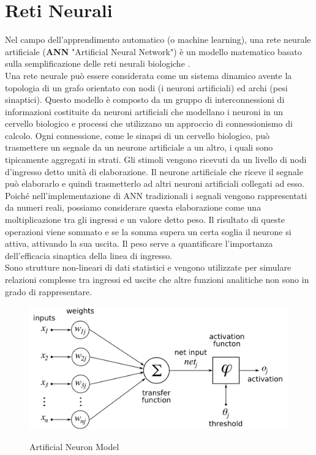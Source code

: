 \chapter{Reti Neurali}
\label{chap:RetiNeurali}

Nel campo dell'apprendimento automatico (o machine learning), una rete neurale artificiale (\textbf{ANN} "Artificial Neural Network") è un modello matematico basato sulla semplificazione delle reti neurali biologiche \cite{samuel1959some}. \\
Una rete neurale può essere considerata come un sistema dinamico avente la topologia di un grafo orientato con nodi (i neuroni artificiali) ed archi (pesi sinaptici).
Questo modello è composto da un gruppo di interconnessioni di informazioni costituite da neuroni artificiali che modellano i neuroni in un cervello biologico e processi che utilizzano un approccio di connessionismo di calcolo.
Ogni connessione, come le sinapsi di un cervello biologico, può trasmettere un segnale da un neurone artificiale a un altro, i quali sono tipicamente aggregati in strati. 
Gli stimoli vengono ricevuti da un livello di nodi d'ingresso detto unità di elaborazione. Il neurone artificiale che riceve il segnale può elaborarlo e quindi trasmetterlo ad altri neuroni artificiali collegati ad esso.\\
Poiché nell'implementazione di ANN tradizionali i segnali vengono rappresentati da numeri reali, possiamo considerare questa elaborazione come una moltiplicazione tra gli ingressi e un valore detto peso. Il risultato di queste operazioni viene sommato e se la somma supera un certa soglia il neurone si attiva, attivando la sua uscita.
Il peso serve a quantificare l'importanza dell'efficacia sinaptica della linea di ingresso.		\\
Sono strutture non-lineari di dati statistici e vengono utilizzate per simulare relazioni complesse tra ingressi ed uscite che altre funzioni analitiche non sono in grado di rappresentare.\\

\begin{figure}
	\centering
	{\includegraphics[width=.65\textwidth]{images/ArtificialNeuronModel}} \quad
	\caption{Artificial Neuron Model}
	\label{fig:Artificial Neuron Model}
\end{figure}

